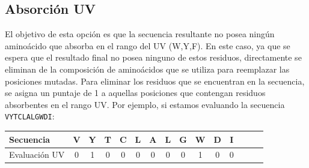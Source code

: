 \subsection{Absorción UV}

El objetivo de esta opción es que la secuencia resultante no posea ningún aminoácido que absorba en el rango del UV (W,Y,F).
En este caso, ya que se espera que el resultado final no posea ninguno de estos residuos, directamente se eliminan de la composición de aminoácidos que se utiliza para reemplazar las posiciones mutadas. 
Para eliminar los residuos que se encuentran en la secuencia, se asigna un puntaje de 1 a aquellas posiciones que contengan residuos absorbentes en el rango UV. 
Por ejemplo, si estamos evaluando la secuencia \texttt{VYTCLALGWDI}:


\begin{center}
\begin{tabular}{lcccccccccccccc} 
\hline
Secuencia 	& \textbf{V} & \textbf{Y} & \textbf{T} & \textbf{C} & \textbf{L} & \textbf{A} & \textbf{L} & \textbf{G} & \textbf{W} & \textbf{D} & \textbf{I}\\ \hline
Evaluación UV 	& 0 & 1 & 0 & 0 & 0 & 0 & 0 & 0 & 1 & 0 & 0  \\ \hline
\end{tabular}
\end{center}











% 
% 
% 
% 
% 







